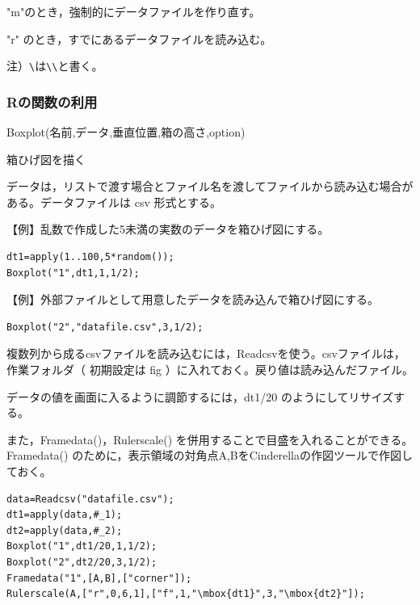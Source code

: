\documentclass[papersize,a4paper,10pt,uplatex]{jsarticle}
\begin{document}
"m"のとき，強制的にデータファイルを作り直す。

"r" のとき，すでにあるデータファイルを読み込む。

注）\verb|\|は\verb|\\|と書く。

\vspace{\baselineskip}

\subsubsection{Rの関数の利用}

\begin{description}

\hypertarget{boxplot}{}
\item[関数]Boxplot(名前,データ,垂直位置,箱の高さ,option)
\item[機能]箱ひげ図を描く
\item[説明]データは，リストで渡す場合とファイル名を渡してファイルから読み込む場合がある。データファイルは csv 形式とする。

\vspace{\baselineskip}
【例】乱数で作成した5未満の実数のデータを箱ひげ図にする。

\begin{verbatim}
dt1=apply(1..100,5*random());
Boxplot("1",dt1,1,1/2);
\end{verbatim}
\vspace{\baselineskip}
\hspace{20mm} 

\vspace{\baselineskip}
【例】外部ファイルとして用意したデータを読み込んで箱ひげ図にする。
\begin{verbatim}
Boxplot("2","datafile.csv",3,1/2);
\end{verbatim}

\vspace{\baselineskip}
複数列から成るcsvファイルを読み込むには，Readcsvを使う。csvファイルは，作業フォルダ（ 初期設定は fig ）に入れておく。戻り値は読み込んだファイル。

データの値を画面に入るように調節するには，dt1/20 のようにしてリサイズする。
 
また，Framedata()，Rulerscale() を併用することで目盛を入れることができる。Framedata() のために，表示領域の対角点A,BをCinderellaの作図ツールで作図しておく。

\begin{verbatim}
data=Readcsv("datafile.csv");
dt1=apply(data,#_1);
dt2=apply(data,#_2);
Boxplot("1",dt1/20,1,1/2);
Boxplot("2",dt2/20,3,1/2);
Framedata("1",[A,B],["corner"]);
Rulerscale(A,["r",0,6,1],["f",1,"\mbox{dt1}",3,"\mbox{dt2}"]);
\end{verbatim}
 \begin{center}  \end{center}


\end{description}
\end{document}
